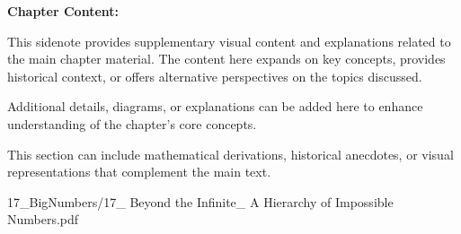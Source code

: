 \begin{SideNotePage}{
  \textbf{Chapter Content:} \par
  This sidenote provides supplementary visual content and explanations related to the main chapter material. The content here expands on key concepts, provides historical context, or offers alternative perspectives on the topics discussed.

  \vspace{0.5em}
  Additional details, diagrams, or explanations can be added here to enhance understanding of the chapter's core concepts.

  \vspace{0.5em}
  This section can include mathematical derivations, historical anecdotes, or visual representations that complement the main text.
}{17_BigNumbers/17_ Beyond the Infinite_ A Hierarchy of Impossible Numbers.pdf}
\end{SideNotePage}
